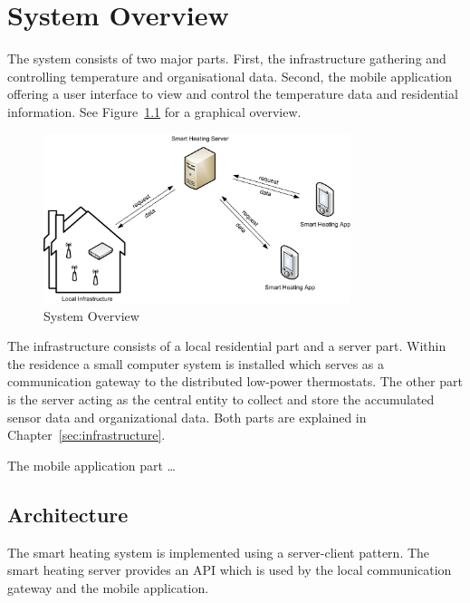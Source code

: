 
\chapter{System Overview}
\label{sec:system_overview}

The system consists of two major parts.
First, the infrastructure gathering and controlling temperature and organisational data.
Second, the mobile application offering a user interface to view and control the temperature data and residential information.
See Figure~\ref{fig:systemoverview} for a graphical overview.

\begin{figure}[h]
\begin{center}
\includegraphics[width=0.8\textwidth]{images/SystemOverview.png}
\end{center}
\caption{System Overview}
\label{fig:systemoverview}
\end{figure}

The infrastructure consists of a local residential part and a server part.
Within the residence a small computer system is installed which serves as a communication gateway to the distributed low-power thermostats.
The other part is the server acting as the central entity to collect and store the accumulated sensor data and organizational data.
Both parts are explained in Chapter~\ref{sec:infrastructure}.

The mobile application part \dots
{}

\section{Architecture}

The smart heating system is implemented using a server-client pattern. The smart heating server provides an API which is used by the local communication gateway and the mobile application.


